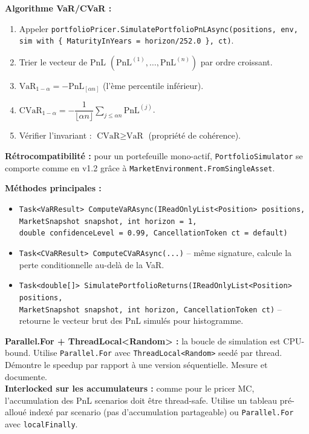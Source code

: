 \documentclass[a4paper,11pt]{article}
\newcommand{\cs}[1]{\texttt{\color{codeinline}#1}}
\begin{document}
\textbf{Algorithme VaR/CVaR :}
\begin{enumerate}[leftmargin=1.5em]
  \item Appeler \cs{portfolioPricer.SimulatePortfolioPnLAsync(positions, env,}\\
        \cs{sim with \{ MaturityInYears = horizon/252.0 \}, ct)}.
  \item Trier le vecteur de PnL $(\text{PnL}^{(1)}, \dots, \text{PnL}^{(n)})$ par ordre croissant.
  \item $\text{VaR}_{1-\alpha} = -\text{PnL}_{[\alpha n]}$ (l'\`eme percentile inf\'erieur).
  \item $\text{CVaR}_{1-\alpha} = -\dfrac{1}{\lfloor\alpha n\rfloor}\sum_{j \le \alpha n}\text{PnL}^{(j)}$.
  \item V\'erifier l'invariant : $\text{CVaR} \ge \text{VaR}$ (propri\'et\'e de coh\'erence).
\end{enumerate}

\textbf{R\'etrocompatibilit\'e :} pour un portefeuille mono-actif, \cs{PortfolioSimulator}
se comporte comme en v1.2 gr\^ace \`a \cs{MarketEnvironment.FromSingleAsset}.

\textbf{M\'ethodes principales :}
\begin{itemize}[leftmargin=1.5em]
  \item \cs{Task<VaRResult> ComputeVaRAsync(IReadOnlyList<Position> positions,}\\
        \cs{MarketSnapshot snapshot, int horizon = 1,}\\
        \cs{double confidenceLevel = 0.99, CancellationToken ct = default)}
  \item \cs{Task<CVaRResult> ComputeCVaRAsync(...)} -- m\^eme signature, calcule la perte
        conditionnelle au-del\`a de la VaR.
  \item \cs{Task<double[]> SimulatePortfolioReturns(IReadOnlyList<Position> positions,}\\
        \cs{MarketSnapshot snapshot, int horizon, CancellationToken ct)} -- retourne
        le vecteur brut des PnL simul\'es pour histogramme.
\end{itemize}

\begin{tcolorbox}[constraint]
\textbf{Parallel.For + ThreadLocal<Random> :} la boucle de simulation est CPU-bound.
Utilise \cs{Parallel.For} avec \cs{ThreadLocal<Random>} seed\'e par thread. D\'emontre
le speedup par rapport \`a une version s\'equentielle. Mesure et documente.\\[4pt]
\textbf{Interlocked sur les accumulateurs :} comme pour le pricer MC, l'accumulation
des PnL scenarios doit \^etre thread-safe. Utilise un tableau pr\'e-allou\'e index\'e par
scenario (pas d'accumulation partageable) ou \cs{Parallel.For} avec \cs{localFinally}.
\end{tcolorbox}
\end{document}
